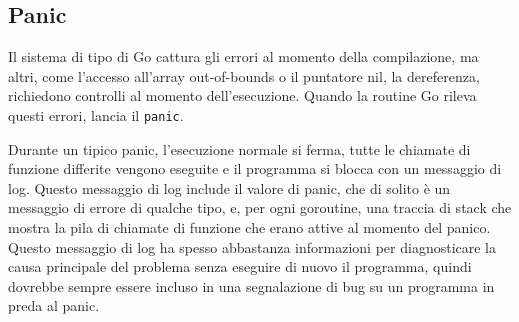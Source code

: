 \documentclass[../../thesis.tex]{subfiles}
\begin{document}
    \subsection{Panic}\label{subsec:panic}
    Il sistema di tipo di Go cattura gli errori al momento della compilazione, ma altri, come l'accesso all'array out-of-bounds o il puntatore nil, la dereferenza, richiedono controlli al momento dell'esecuzione.
    Quando la routine Go rileva questi errori, lancia il \verb"panic".
    \hfill \vspace{12pt}

    Durante un tipico panic, l'esecuzione normale si ferma, tutte le chiamate di funzione differite vengono eseguite e il programma si blocca con un messaggio di log.
    Questo messaggio di log include il valore di panic, che di solito è un messaggio di errore di qualche tipo, e, per ogni goroutine, una traccia di stack che mostra la pila di chiamate di funzione che erano attive al momento del panico.
    Questo messaggio di log ha spesso abbastanza informazioni per diagnosticare la causa principale del problema senza eseguire di nuovo il programma, quindi dovrebbe sempre essere incluso in una segnalazione di bug su un programma in preda al panic.
\end{document}
